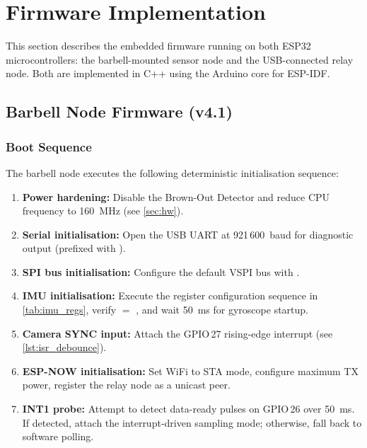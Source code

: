 \section{Firmware Implementation}\label{sec:firmware}

This section describes the embedded firmware running on both ESP32 microcontrollers: the barbell-mounted sensor node and the USB-connected relay node.
Both are implemented in C++ using the Arduino core for ESP-IDF.


\subsection{Barbell Node Firmware (v4.1)}

\subsubsection{Boot Sequence}

The barbell node executes the following deterministic initialisation sequence:
\begin{enumerate}[nosep]
  \item \textbf{Power hardening:} Disable the Brown-Out Detector and reduce CPU frequency to \SI{160}{\mega\hertz} (see \cref{sec:hw}).
  \item \textbf{Serial initialisation:} Open the USB UART at 921\,600~baud for diagnostic output (prefixed with \code{\#}).
  \item \textbf{SPI bus initialisation:} Configure the default VSPI bus with .
  \item \textbf{IMU initialisation:} Execute the register configuration sequence in \cref{tab:imu_regs}, verify  $=$ , and wait \SI{50}{\milli\second} for gyroscope startup.
  \item \textbf{Camera SYNC input:} Attach the GPIO\,27 rising-edge interrupt (see \cref{lst:isr_debounce}).
  \item \textbf{ESP-NOW initialisation:} Set WiFi to STA mode, configure maximum TX power, register the relay node as a unicast peer.
  \item \textbf{INT1 probe:} Attempt to detect data-ready pulses on GPIO\,26 over \SI{50}{\milli\second}. If detected, attach the interrupt-driven sampling mode; otherwise, fall back to software polling.
\end{enumerate}

